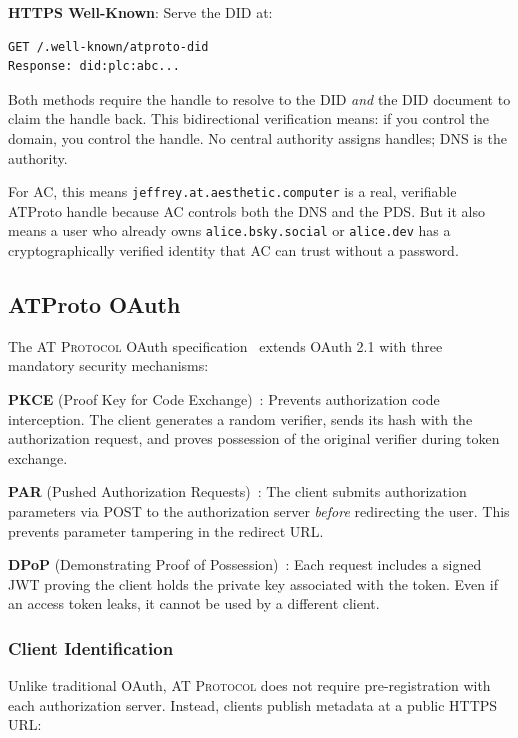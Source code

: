\documentclass[10pt,letterpaper,twocolumn]{article}
\newcommand{\atproto}{\textsc{AT Protocol}}
\begin{document}
\textbf{HTTPS Well-Known}: Serve the DID at:
\begin{lstlisting}
GET /.well-known/atproto-did
Response: did:plc:abc...
\end{lstlisting}

Both methods require the handle to resolve to the DID \emph{and} the DID document to claim the handle back. This bidirectional verification means: if you control the domain, you control the handle. No central authority assigns handles; DNS is the authority.

For AC, this means \texttt{jeffrey.at.aesthetic.computer} is a real, verifiable ATProto handle because AC controls both the DNS and the PDS. But it also means a user who already owns \texttt{alice.bsky.social} or \texttt{alice.dev} has a cryptographically verified identity that AC can trust without a password.

\subsection{ATProto OAuth}

The \atproto{} OAuth specification~\citep{atproto2024oauth} extends OAuth 2.1 with three mandatory security mechanisms:

\textbf{PKCE} (Proof Key for Code Exchange)~\citep{rfc7636pkce}: Prevents authorization code interception. The client generates a random verifier, sends its hash with the authorization request, and proves possession of the original verifier during token exchange.

\textbf{PAR} (Pushed Authorization Requests)~\citep{rfc9126par}: The client submits authorization parameters via POST to the authorization server \emph{before} redirecting the user. This prevents parameter tampering in the redirect URL.

\textbf{DPoP} (Demonstrating Proof of Possession)~\citep{rfc9449dpop}: Each request includes a signed JWT proving the client holds the private key associated with the token. Even if an access token leaks, it cannot be used by a different client.

\subsubsection{Client Identification}

Unlike traditional OAuth, \atproto{} does not require pre-registration with each authorization server. Instead, clients publish metadata at a public HTTPS URL:
\end{document}
